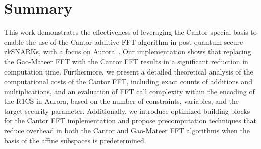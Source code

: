 \section{Summary} \label{Sec:Summary}
This work demonstrates the effectiveness of leveraging the Cantor special basis to enable the use of the Cantor additive FFT algorithm in post-quantum secure zkSNARKs, with a focus on Aurora~\cite{Aurora2019}. Our implementation shows that replacing the Gao-Mateer FFT with the Cantor FFT results in a significant reduction in computation time. Furthermore, we present a detailed theoretical analysis of the computational costs of the Cantor FFT, including exact counts of additions and multiplications, and an evaluation of FFT call complexity within the encoding of the R1CS in Aurora, based on the number of constraints, variables, and the target security parameter. Additionally, we introduce optimized building blocks for the Cantor FFT implementation and propose precomputation techniques that reduce overhead in both the Cantor and Gao-Mateer FFT algorithms when the basis of the affine subspaces is predetermined.

